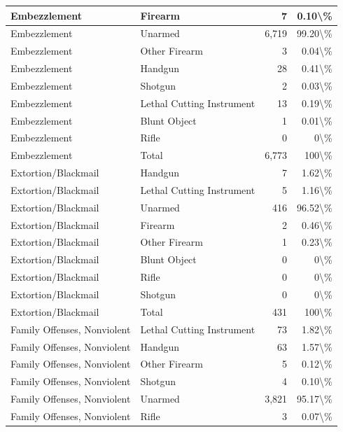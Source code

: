 \documentclass[
]{krantz}
\begin{document}
\begin{longtable}[t]{l|l|r|r}
\hline
Embezzlement & Firearm & 7 & 0.10\textbackslash{}\%\\
\hline
Embezzlement & Unarmed & 6,719 & 99.20\textbackslash{}\%\\
\hline
Embezzlement & Other Firearm & 3 & 0.04\textbackslash{}\%\\
\hline
Embezzlement & Handgun & 28 & 0.41\textbackslash{}\%\\
\hline
Embezzlement & Shotgun & 2 & 0.03\textbackslash{}\%\\
\hline
Embezzlement & Lethal Cutting Instrument & 13 & 0.19\textbackslash{}\%\\
\hline
Embezzlement & Blunt Object & 1 & 0.01\textbackslash{}\%\\
\hline
Embezzlement & Rifle & 0 & 0\textbackslash{}\%\\
\hline
Embezzlement & Total & 6,773 & 100\textbackslash{}\%\\
\hline
Extortion/Blackmail & Handgun & 7 & 1.62\textbackslash{}\%\\
\hline
Extortion/Blackmail & Lethal Cutting Instrument & 5 & 1.16\textbackslash{}\%\\
\hline
Extortion/Blackmail & Unarmed & 416 & 96.52\textbackslash{}\%\\
\hline
Extortion/Blackmail & Firearm & 2 & 0.46\textbackslash{}\%\\
\hline
Extortion/Blackmail & Other Firearm & 1 & 0.23\textbackslash{}\%\\
\hline
Extortion/Blackmail & Blunt Object & 0 & 0\textbackslash{}\%\\
\hline
Extortion/Blackmail & Rifle & 0 & 0\textbackslash{}\%\\
\hline
Extortion/Blackmail & Shotgun & 0 & 0\textbackslash{}\%\\
\hline
Extortion/Blackmail & Total & 431 & 100\textbackslash{}\%\\
\hline
Family Offenses, Nonviolent & Lethal Cutting Instrument & 73 & 1.82\textbackslash{}\%\\
\hline
Family Offenses, Nonviolent & Handgun & 63 & 1.57\textbackslash{}\%\\
\hline
Family Offenses, Nonviolent & Other Firearm & 5 & 0.12\textbackslash{}\%\\
\hline
Family Offenses, Nonviolent & Shotgun & 4 & 0.10\textbackslash{}\%\\
\hline
Family Offenses, Nonviolent & Unarmed & 3,821 & 95.17\textbackslash{}\%\\
\hline
Family Offenses, Nonviolent & Rifle & 3 & 0.07\textbackslash{}\%\\

\end{longtable}
\end{document}
